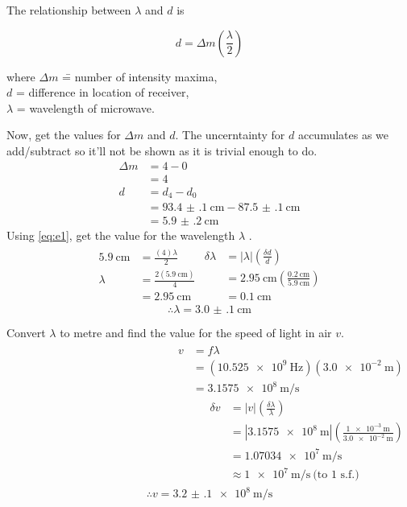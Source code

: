 \documentclass[letter,12pt]{article}
\newcommand{\tlambda}{\(\lambda\) }
\numberwithin{equation}{section}
\numberwithin{figure}{section}
\numberwithin{table}{section}
\begin{document}
The relationship between \tlambda and \(d\) is

\begin{equation} \label{eq:e1}
  d = \Delta m \left( \frac{\lambda}{2} \right)
\end{equation} 
\nopagebreak[4]
\begin{tabbing}
  where \= \(\Delta m\) \= = number of intensity maxima, \\
  \> \(d\) \> = difference in location of receiver, \\
  \> \tlambda \> = wavelength of microwave.
\end{tabbing}

Now, get the values for \(\Delta m\) and \(d\). The uncerntainty for \(d\) accumulates as we add/subtract so it'll not be shown as it is trivial enough to do.
\begin{align*}
  \Delta m &= 4 - 0 \\
  &= 4 \\
  d &= d_4 - d_0 \\
  &= \SI{93.4(1)}{\cm} - \SI{87.5(1)}{\cm} \\
  &= \SI{5.9(2)}{\cm}
\end{align*}
Using \eqref{eq:e1}, get the value for the wavelength \tlambda.
\begin{align*}
  \begin{split}
    \SI{5.9}{\cm} &= \frac{(4) \lambda}{2} \\
    \lambda &= \frac{2(\SI{5.9}{\cm})}{4} \\
    &= \SI{2.95}{\cm}
  \end{split}
  \begin{split}
    \delta \lambda &= |\lambda|\left( \frac{\delta d}{d} \right) \\
    &= \SI{2.95}{\cm} \left( \frac{\SI{0.2}{\cm}}{\SI{5.9}{\cm}} \right) \\
    &= \SI{0.1}{\cm}
  \end{split}
\end{align*}
\[\therefore \lambda = \SI{3.0(1)}{\cm}\]

Convert \tlambda to metre and find the value for the speed of light in air \(v\).
\begin{align*}
  \begin{split}
    v &= f \lambda \\
    &= (\SI{10.525e9}{\hertz})(\SI{3.0e-2}{\m}) \\
    &= \SI{3.1575e8}{\m\per\s}
  \end{split}
  \begin{split}
    \delta v &= |v| \left( \frac{\delta \lambda}{\lambda} \right) \\
    &= |\SI{3.1575e8}{\m}| \left( \frac{\SI{1e-3}{\m}}{\SI{3.0e-2}{\m}} \right) \\
    &= \SI{1.07034e7}{\m\per\s} \\
    &\approx \SI{1e7}{\m\per\s} \ \text{(to 1 s.f.)}
  \end{split}
\end{align*}
\[\therefore v = \SI{3.2(1)e8}{\m\per\s}\]
\end{document}
